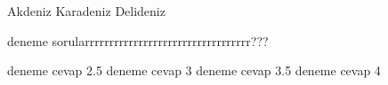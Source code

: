 \documentclass[addpoints]{exam}
\begin{document}
\begin{questions}
\begin{checkboxes}
\choice Akdeniz
\choice Karadeniz
\choice Delideniz
\end{checkboxes}
\question deneme sorularrrrrrrrrrrrrrrrrrrrrrrrrrrrrrrrrr???
\begin{checkboxes}
\choice deneme cevap 2.5
\choice deneme cevap 3
\choice deneme cevap 3.5
\choice deneme cevap 4
\end{checkboxes}
\end{questions}
\end{document}
